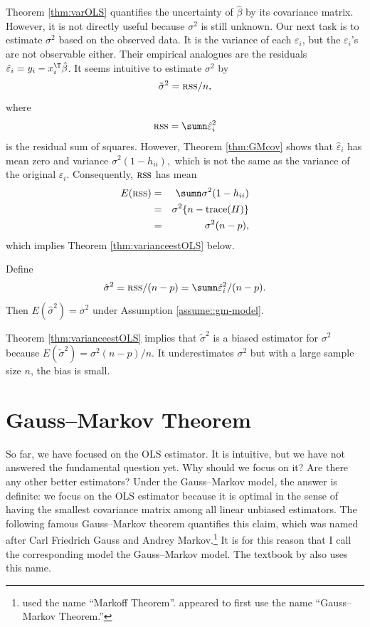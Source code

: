 Theorem \ref{thm:varOLS} quantifies the uncertainty of $\hat{\beta}$
by its covariance matrix. However, it is not directly useful because
$\sigma^{2}$ is still unknown. Our next task is to estimate $\sigma^{2}$ based on
the observed data. It is the variance of each $\varepsilon_{i}$,
but the $\varepsilon_{i}$'s are not observable either. Their empirical
analogues are the residuals $\hat{\varepsilon}_{i}=y_{i}-x_{i}^{\T}\hat{\beta}$.
It seems intuitive to estimate $\sigma^{2}$ by 
\[
\tilde{\sigma}^{2}=\textsc{rss}/n , 
\]
where
\[
\textsc{rss}=\sumn\hat{\varepsilon}_{i}^{2}
\]
is the residual sum of squares. However, Theorem \ref{thm:GMcov}
shows that $\hat{\varepsilon}_{i}$ has mean zero and variance $\sigma^{2}(1-h_{ii}),$
which is not the same as the variance of the original $\varepsilon_{i}.$ Consequently,  $\textsc{rss}$ has mean 
\begin{eqnarray*}
E(\textsc{rss}) 
&=& 
\sumn\sigma^{2}(1-h_{ii}) \\
&=& \sigma^{2} \{ n-\text{trace}(H) \} \\
&=& \sigma^{2}(n-p),
\end{eqnarray*}
which implies Theorem \ref{thm:varianceestOLS} below. 


\begin{theorem}
\label{thm:varianceestOLS}Define 
$$
\hat{\sigma}^{2}=\textsc{rss}/(n-p)=\sumn\hat{\varepsilon}_{i}^{2}/(n-p).
$$
Then $E(\hat{\sigma}^{2})=\sigma^{2}$ under Assumption \ref{assume::gm-model}. 
\end{theorem}


Theorem \ref{thm:varianceestOLS} implies that $\tilde{\sigma}^{2}$
is a biased estimator for $\sigma^{2}$ because $E(\tilde{\sigma}^{2})=\sigma^{2}(n-p)/n.$
It underestimates $\sigma^{2}$ but with a large sample size $n$, the bias is
small. 

\section{Gauss--Markov Theorem}

So far, we have focused on the OLS estimator. It is intuitive, but
we have not answered the fundamental question yet. Why should we focus
on it? Are there any other better estimators? Under the Gauss--Markov
model, the answer is definite: we focus on the OLS estimator because
it is optimal in the sense of having the smallest covariance matrix
among all linear unbiased estimators. The following famous Gauss--Markov
theorem quantifies this claim, which was named after Carl Friedrich Gauss and Andrey Markov.\footnote{\citet{david1938extensions} used the name ``Markoff Theorem''. \citet{lehmann1951general} appeared to first use the name ``Gauss--Markov Theorem.''} It is for this reason that I call the
corresponding model the Gauss--Markov model. The textbook by \citet{monahan2008primer} also uses this name. 







